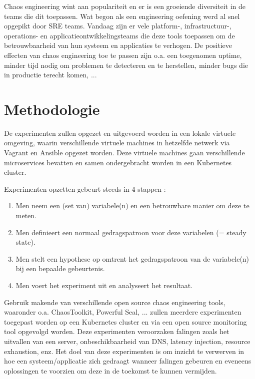 Chaos engineering wint aan populariteit en er is een groeiende diversiteit in de teams die dit toepassen. Wat begon als een engineering oefening werd al snel opgepikt door SRE teams. Vandaag zijn er vele platform-, infrastructuur-, operations- en applicatieontwikkelingsteams die deze tools toepassen om de betrouwbaarheid van hun systeem en applicaties te verhogen.
De positieve effecten van chaos engineering toe te passen zijn o.a. een toegenomen uptime, minder tijd nodig om problemen te detecteren en te herstellen, minder bugs die in productie terecht komen, ... \autocite{KoltonAndrus2021}


\section{Methodologie}
\label{sec:methodologie}

De experimenten zullen opgezet en uitgevoerd worden in een lokale virtuele omgeving, waarin verschillende virtuele machines in hetzelfde netwerk via Vagrant en Ansible opgezet worden. Deze virtuele machines gaan  verschillende microservices bevatten en  samen ondergebracht worden in een Kubernetes cluster. 

Experimenten opzetten gebeurt steeds in 4 stappen \autocite{Pawlikowski2020}:
\begin{enumerate}
    \item Men neem een (set van) variabele(n) en een betrouwbare manier om deze te meten.
    \item Men definieert een normaal gedragspatroon voor deze variabelen (= steady state).
    \item Men stelt een hypothese op omtrent het gedragspatroon van de variabele(n) bij een bepaalde gebeurtenis.
    \item Men voert het experiment uit en analyseert het resultaat.
\end{enumerate}
Gebruik makende van verschillende open source chaos engineering tools, waaronder o.a. ChaosToolkit, Powerful Seal, ... zullen meerdere experimenten toegepast worden op een Kubernetes cluster en via een open source monitoring tool opgevolgd worden. Deze experimenten veroorzaken falingen zoals het uitvallen van een server, onbeschikbaarheid van DNS, latency injection, resource exhaustion, enz. Het doel van deze experimenten is om inzicht te verwerven in hoe een systeem/applicatie zich gedraagt wanneer falingen gebeuren en eveneens oplossingen te voorzien om deze in de toekomst te kunnen vermijden. 


